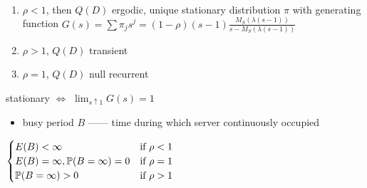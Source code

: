 \begin{thm}\,
    \begin{enumerate}
        \item $\rho < 1$, then $Q(D)$ ergodic, unique stationary distribution $\pi$ with generating function
        $G(s) = \sum \pi_j s^j = (1 - \rho)(s - 1)\frac{M_S(\lambda(s-1))}{s - M_S(\lambda(s - 1))}$
        \item $\rho > 1$, $Q(D)$ transient
        \item $\rho = 1$, $Q(D)$ null recurrent
    \end{enumerate}
\end{thm}
\begin{pf}
    stationary $\iff$ $\lim_{s \uparrow 1}G(s) = 1$
\end{pf}
\begin{itemize}
    \item busy period $B$ ------ time during which server continuously occupied
\end{itemize}

\begin{fact}
    $\begin{cases}
        E(B)   < \infty & \text{if } \rho < 1\\
        E(B)   = \infty, \mathbb{P}(B = \infty) = 0 & \text{if } \rho = 1\\
        \mathbb{P}(B = \infty) > 0 & \text{if } \rho > 1\\
    \end{cases}$
\end{fact}
